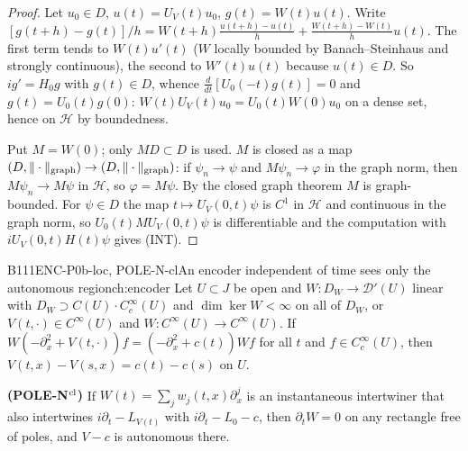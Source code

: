 \begin{proof}
Let $u_0\in D$, $u(t)=U_V(t)u_0$, $g(t)=W(t)u(t)$. Write $[g(t+h)-g(t)]/h=W(t+h)\frac{u(t+h)-u(t)}h+\frac{W(t+h)-W(t)}hu(t)$. The first term tends to $W(t)u'(t)$ ($W$ locally bounded by Banach--Steinhaus and strongly continuous), the second to $W'(t)u(t)$ because $u(t)\in D$. So $ig'=H_0g$ with $g(t)\in D$, whence $\frac d{dt}[U_0(-t)g(t)]=0$ and $g(t)=U_0(t)g(0)$: $W(t)U_V(t)u_0=U_0(t)W(0)u_0$ on a dense set, hence on $\mathcal H$ by boundedness.

Put $M=W(0)$; only $MD\subset D$ is used. $M$ is closed as a map $(D,\|\cdot\|_{\rm graph})\to(D,\|\cdot\|_{\rm graph})$: if $\psi_n\to\psi$ and $M\psi_n\to\varphi$ in the graph norm, then $M\psi_n\to M\psi$ in $\mathcal H$, so $\varphi=M\psi$. By the closed graph theorem $M$ is graph-bounded. For $\psi\in D$ the map $t\mapsto U_V(0,t)\psi$ is $C^1$ in $\mathcal H$ and continuous in the graph norm, so $U_0(t)MU_V(0,t)\psi$ is differentiable and the computation with $iU_V(0,t)H(t)\psi$ gives (INT).

\end{proof}

\begin{dimcard}{B111}{ENC-P0b-loc, POLE-N-cl}{An encoder independent of time sees only the autonomous region}{\pw}{ch:encoder}
Let $U\subset J$ be open and $W:D_W\to\mathcal D'(U)$ linear with $D_W\supset C(U)\cdot C_c^\infty(U)$ and $\dim\ker W<\infty$ on all of $D_W$, or $V(t,\cdot)\in C^\infty(U)$ and $W:C^\infty(U)\to C^\infty(U)$. If $W(-\partial_x^2+V(t,\cdot))f=(-\partial_x^2+c(t))Wf$ for all $t$ and $f\in C_c^\infty(U)$, then $V(t,x)-V(s,x)=c(t)-c(s)$ on $U$.

\textbf{(POLE-N$^{\rm cl}$)} If $W(t)=\sum_jw_j(t,x)\partial_x^j$ is an instantaneous intertwiner that also intertwines $i\partial_t-L_{V(t)}$ with $i\partial_t-L_0-c$, then $\partial_tW=0$ on any rectangle free of poles, and $V-c$ is autonomous there.
\end{dimcard}

